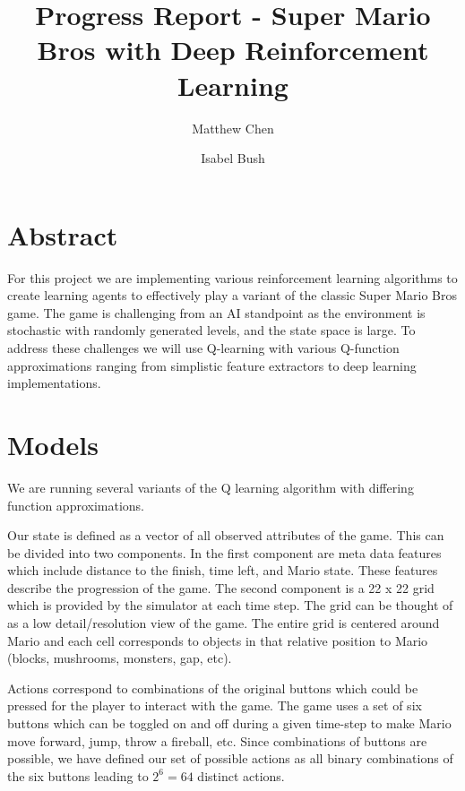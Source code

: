 \documentclass[12pt]{article}
\begin{document}
\nocite{*}

\title{Progress Report - Super Mario Bros with Deep Reinforcement Learning}

\author{
  Matthew Chen
  \and
  Isabel Bush
}
\date{}
\maketitle


\section{Abstract}

For this project we are implementing various reinforcement learning algorithms to create learning agents to effectively play a variant of the classic Super Mario Bros game. The game is challenging from an AI standpoint as the environment is stochastic with randomly generated levels, and the state space is large. To address these challenges we will use Q-learning with various Q-function approximations ranging from simplistic feature extractors to deep learning implementations.


\section{Models}

We are running several variants of the Q learning algorithm with differing function approximations. 

Our state is defined as a vector of all observed attributes of the game. This can be divided into two components. In the first component are meta data features which include distance to the finish, time left, and Mario state. These features describe the progression of the game. The second component is a 22 x 22 grid which is provided by the simulator at each time step. The grid can be thought of as a low detail/resolution view of the game. The entire grid is centered around Mario and each cell corresponds to objects in that relative position to Mario (blocks, mushrooms, monsters, gap, etc).

Actions correspond to combinations of the original buttons which could be pressed for the player to interact with the game. The game uses a set of six buttons which can be toggled on and off during a given time-step to make Mario move forward, jump, throw a fireball, etc. Since combinations of buttons are possible, we have defined our set of possible actions as all binary combinations of the six buttons leading to $2^6 = 64$ distinct actions.
\end{document}
